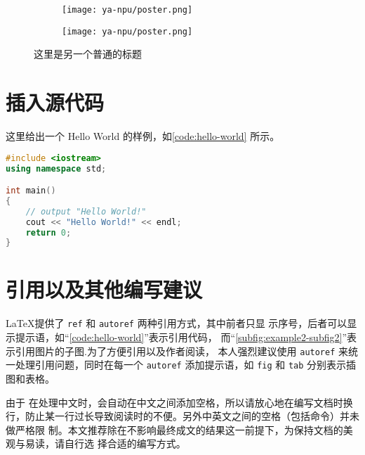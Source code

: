 \documentclass[lang=chs, degree=phd, blindreview=false, winfonts=true]{ya-npu/yanputhesis}
\theoremstyle{plain}%
\theoremstyle{remark}%
\begin{document}
\begin{figure}[htb]
    \centering
    \begin{minipage}[t]{0.96\textwidth}
        \centering
        \begin{subfigure}[t]{0.47\textwidth}
            \centering
            \texttt{[image: ya-npu/poster.png]}
            \caption{\label{subfig:example2-subfig1}}
        \end{subfigure}
        \begin{subfigure}[t]{0.47\textwidth}
            \centering
            \texttt{[image: ya-npu/poster.png]}
            \caption{\label{subfig:example2-subfig2}}
        \end{subfigure}
    \end{minipage}
    \caption{这里是另一个普通的标题}
    \label{fig:example2}
\end{figure}

\section{插入源代码}

这里给出一个 Hello World 的样例，如\autoref{code:hello-world} 所示。

\begin{lstlisting}[language={C++}, label={code:hello-world},
    caption={Hello World.cpp}]
#include <iostream>
using namespace std;

int main()
{
    // output "Hello World!"
    cout << "Hello World!" << endl;
    return 0;
}
\end{lstlisting}

\section{引用以及其他编写建议}

\LaTeX 提供了 \lstinline`ref` 和 \lstinline`autoref` 两种引用方式，其中前者只显
示序号，后者可以显示提示语，如“\autoref{code:hello-world}”表示引用代码，
而“\autoref{subfig:example2-subfig2}”表示引用图片的子图.为了方便引用以及作者阅读，
本人强烈建议使用 \lstinline`autoref` 来统一处理引用问题，同时在每一个
\lstinline`autoref` 添加提示语，如 \lstinline`fig` 和 \lstinline`tab` 分别表示插
图和表格。

由于 \XeLaTeX 在处理中文时，会自动在中文之间添加空格，所以请放心地在编写文档时换
行，防止某一行过长导致阅读时的不便。另外中英文之间的空格（包括命令）并未做严格限
制。本文推荐除在不影响最终成文的结果这一前提下，为保持文档的美观与易读，请自行选
择合适的编写方式。
\end{document}
